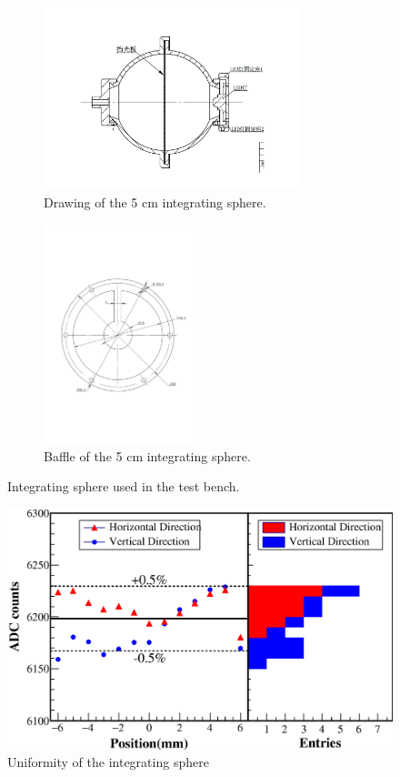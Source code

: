 \documentclass[]{article}
\begin{document}
\begin{figure}[!htb]
	\begin{subfigure}[t]{75mm}
		\includegraphics[width=75mm]{is_drawing}
		\caption{Drawing of the 5 cm integrating sphere.}
		\label{fig:is_drawing}
	\end{subfigure}
	\begin{subfigure}[t]{45mm}
		\includegraphics[width=45mm]{baffle}
		\caption{Baffle of the 5 cm integrating sphere.}
		\label{fig:baffle}
	\end{subfigure}
	\caption{Integrating sphere used in the test bench.}
\end{figure}

\begin{figure}
\centering
\includegraphics[width=0.7\linewidth]{uniformity_integrationsphere}
\caption{Uniformity of the integrating sphere}
\label{fig:uniformity_integrationsphere}
\end{figure}
\end{document}
